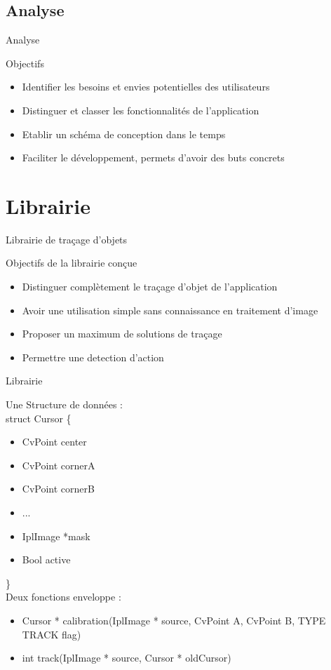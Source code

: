 \documentclass{beamer}
\begin{document}
	\subsection{Analyse}
		\begin{frame}{Analyse}
				\begin{exampleblock}{Objectifs}
				\begin{itemize}
					\item{Identifier les besoins et envies potentielles des utilisateurs}
					\item{Distinguer et classer les fonctionnalités de l'application}
					\item{Etablir un schéma de conception dans le temps}
					\item{Faciliter le développement, permets d'avoir des buts concrets}
				\end{itemize}
				\end{exampleblock}
		\end{frame}
	
	\section{Librairie}
		\begin{frame}{Librairie de traçage d'objets}
			\begin{block}{Objectifs de la librairie conçue}
				\begin{itemize}
				\item{Distinguer complètement le traçage d'objet de l'application}
				\item{Avoir une utilisation simple sans connaissance en traitement d'image}
				\item{Proposer un maximum de solutions de traçage}
				\item{Permettre une detection d'action}
				\end{itemize}
			\end{block}
		\end{frame}

		\begin{frame}{Librairie}

		Une Structure de données : \\
		struct Cursor \{
		\begin{itemize}
			\item{CvPoint center}
			\item{CvPoint cornerA}
			\item{CvPoint cornerB}
			\item{...}
			\item{IplImage *mask}
			\item{Bool active}
		\end{itemize}
		\} \\
		Deux fonctions enveloppe : \\
				\begin{itemize}
					\item{Cursor * calibration(IplImage * source, CvPoint A, CvPoint B, TYPE TRACK flag)}
					\item{int track(IplImage * source, Cursor * oldCursor)}
				\end{itemize}
		
		
		\end{frame}
\end{document}
